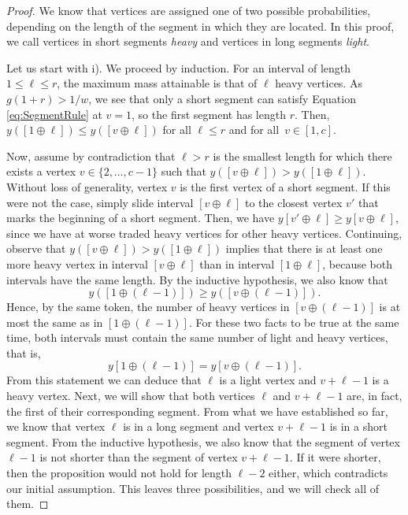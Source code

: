 \documentclass[11pt]{article}
\newcommand\+{\mkern2mu}
\begin{document}
\begin{proof}
        We know that vertices are assigned one of two possible probabilities, depending on the length of the segment in which they are located. In this proof, we call vertices in short segments \emph{heavy} and vertices in long segments \emph{light}. 
    
    Let us start with i). We proceed by induction. For an interval of length $1 \leq \ell \leq r$, the maximum mass attainable is that of $\ell$ heavy vertices. As $g(1+r) > 1/w$, we see that only a short segment can satisfy Equation \eqref{eq:SegmentRule} at $v=1$, so the first segment has length $r$. Then, $y([1\oplus \ell]) \leq y([v\oplus \ell])$ for all $\ell \leq r$ and for all~$v\in [1,c]$.  
    
    Now, assume by contradiction that $\ell > r$ is the smallest length for which there exists a vertex $v \in \{2, \ldots, c-1\}$ such that $y([v\oplus \ell]) > y([1\oplus \ell])$. Without loss of generality, vertex $v$ is the first vertex of a short segment. If this were not the case, simply slide interval $[v \oplus \ell]$ to the closest vertex $v'$ that marks the beginning of a short segment. Then, we have $y[v' \oplus \ell] \geq y[v \oplus \ell]$, since we have at worse traded heavy vertices for other heavy vertices. Continuing, observe that $y([v\oplus \ell]) > y([1\oplus \ell])$ implies that there is at least one more heavy vertex in interval $[v \oplus \ell]$ than in interval $[1 \oplus \ell]$, because both intervals have the same length. By the inductive hypothesis, we also know that
    $$y([1\oplus (\ell-1)]) \ge y([v\oplus (\ell-1)]).$$  
    Hence, by the same token, the number of heavy vertices in $[v \oplus (\ell-1)]$ is at most the same as in $[1 \oplus (\ell - 1)]$. For these two facts to be true at the same time, both intervals must contain the same number of light and heavy vertices, that is,
    \begin{equation}
    y[1 \oplus (\ell-1)] = y[v \oplus (\ell-1)]. 
    \label{eq:lemma3.6}
    \end{equation}
    From this statement we can deduce that $\ell$ is a light vertex and $v + \ell - 1$ is a heavy vertex. Next, we will show that both vertices $\ell$ and $v + \ell - 1$ are, in fact, the first of their corresponding segment. From what we have established so far, we know that vertex $\ell$ is in a long segment and vertex $v + \ell - 1$ is in a short segment. From the inductive hypothesis, we also know that the segment of vertex $\ell-1$ is not shorter than the segment of vertex $v + \ell - 1$. If it were shorter, then the proposition would not hold for length $\ell-2$ either, which contradicts our initial assumption. This leaves three possibilities, and we will check all of them. 
    

\end{proof}
\end{document}
